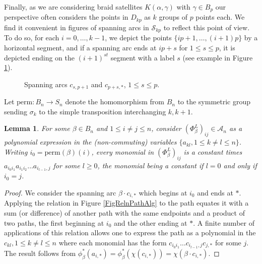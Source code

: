 \documentclass[11pt]{amsart}
\def\A{{\mathcal A}}
\def\s{{\sigma}}
\newtheorem{lem}[thm]{Lemma}
\theoremstyle{definition}
\begin{document}
  Finally, as we are considering braid satellites $K(\alpha,\gamma)$ with $\gamma\in B_p$ our perspective often considers the points in $D_{kp}$ as $k$ groups of $p$ points each. We find it convenient in figures of spanning arcs in $\mathscr S_{kp}$ to reflect this point of view. To do so, for each $i=0,\ldots,k-1$, we depict the points $\{ip+1,\ldots, (i+1)p\}$ by a horizontal segment, and if a spanning arc ends at $ip+s$ for $1\le s\le p$, it is depicted ending on the $(i+1)^{st}$ segment with a label $s$ (see example in Figure \ref{FigExSpanArckp}).

  \begin{figure}[ht]
      \caption{Spanning arcs $c_{s,p+1}$ and $c_{p+s,\ast}$, $1\le s\le p$.}
      \label{FigExSpanArckp}
    \end{figure}

  Let $\text{perm}:B_n\to S_n$ denote the homomorphism from $B_n$ to the symmetric group sending $\s_k$ to the simple transposition interchanging $k, k+1$.

  \begin{lem} For some $\beta\in B_n$ and $1\le i\ne j\le n$, consider $(\Phi_\beta^L)_{ij}\in \A_n$ as a polynomial expression in the (non-commuting) variables $\{a_{kl}, 1\le k\ne l\le n\}$. Writing $i_0=\text{perm}(\beta)(i)$, every monomial in $(\Phi_\beta^L)_{ij}$ is a constant times $a_{i_0i_1}a_{i_1i_2}\ldots a_{i_{l-1},j}$ for some $l\ge 0$, the monomial being a constant if $l=0$ and only if $i_0=j$.
  \label{lem:monomial}
  \end{lem}
  \begin{proof}We consider the spanning arc $\beta\cdot c_{i,\ast}$ which begins at $i_0$ and ends at $\ast$. Applying the relation in Figure \ref{FigRelnPathAlg} to the path equates it with a sum (or difference) of another path with the same endpoints and a product of two paths, the first beginning at $i_0$ and the other ending at $\ast$. A finite number of applications of this relation allows one to express the path as a polynomial in the $c_{kl}, 1\le k\ne l\le n$ where each monomial has the form $c_{i_0i_1}\ldots c_{i_{l-1},j}c_{j,\ast}$ for some $j$. The result follows from $\phi^\ast_\beta(a_{i,\ast}) = \phi^\ast_\beta(\chi(c_{i,\ast})) = \chi(\beta\cdot c_{i,\ast})$.
  \end{proof}
\end{document}
